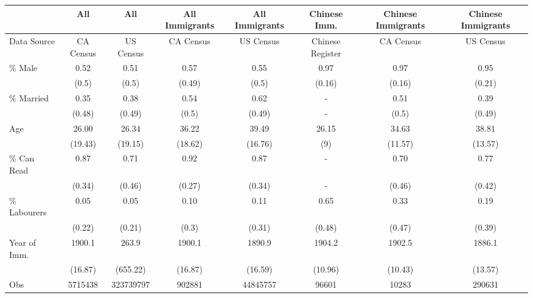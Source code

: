 \begin{tabular}{lccccccc}
  \hline
 & All & All & All Immigrants & All Immigrants & Chinese Imm. & Chinese Immigrants & Chinese Immigrants \\ 
  \hline
Data Source & CA Census & US Census & CA Census & US Census & Chinese Register & CA Census & US Census \\ 
  \% Male & 0.52 & 0.51 & 0.57 & 0.55 & 0.97 & 0.97 & 0.95 \\ 
   & (0.5) & (0.5) & (0.49) & (0.5) & (0.16) & (0.16) & (0.21) \\ 
  \% Married & 0.35 & 0.38 & 0.54 & 0.62 & - & 0.51 & 0.39 \\ 
    & (0.48) & (0.49) & (0.5) & (0.49) & - & (0.5) & (0.49) \\ 
  Age & 26.00 & 26.34 & 36.22 & 39.49 & 26.15 & 34.63 & 38.81 \\ 
     & (19.43) & (19.15) & (18.62) & (16.76) & (9) & (11.57) & (13.57) \\ 
  \% Can Read & 0.87 & 0.71 & 0.92 & 0.87 & - & 0.70 & 0.77 \\ 
      & (0.34) & (0.46) & (0.27) & (0.34) & - & (0.46) & (0.42) \\ 
  \% Labourers & 0.05 & 0.05 & 0.10 & 0.11 & 0.65 & 0.33 & 0.19 \\ 
        & (0.22) & (0.21) & (0.3) & (0.31) & (0.48) & (0.47) & (0.39) \\ 
  Year of Imm. & 1900.1 &  263.9 & 1900.1 & 1890.9 & 1904.2 & 1902.5 & 1886.1 \\ 
             & (16.87) & (655.22) & (16.87) & (16.59) & (10.96) & (10.43) & (13.57) \\ 
   \hline
Obs &   5715438 & 323739797 &    902881 &  44845757 &     96601 &     10283 &    290631 \\ 
   \hline
\end{tabular}
